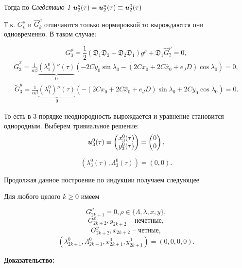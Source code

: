 Тогда по \textit{Следствию 1} $\boldsymbol{u}_2^s(\tau) = \boldsymbol{u}_2^u(\tau) \equiv \boldsymbol{u}_2^0(\tau)$

Т.к. $G_k^\rho$ и $\hat G_k^\rho$ отличаются только нормировкой то вырождаются они одновременно. В таком случае:

$$G_3^\rho = \frac12 (\mathfrak{D}_1 \mathfrak{D}_2 + \mathfrak{D}_2 \mathfrak{D}_1)g^\rho + \mathfrak{D}_1 \hat G_2^\rho = 0,$$
\begin{equation*}
\begin{aligned}
\tilde G_3^x  = \frac{1}{\alpha \beta} \underbrace{(\lambda^0_1)''(\tau)}_0 \left( -2Cy_0 \sin\lambda_0 - (2Cx_0+2C \hat x_0+e_JD) \cos\lambda_0 \right) =0,
\end{aligned}
\end{equation*}
\begin{equation*}
\begin{aligned}
\tilde G_3^y  = \frac{1}{\alpha \beta} \underbrace{(\lambda^0_1)''(\tau)}_0 \left( -(2Cx_0+2C \hat x_0+e_JD) \sin\lambda_0 + 2Cy_0 \cos\lambda_0 \right) = 0.
\end{aligned}
\end{equation*}

То есть в 3 порядке неоднородность вырождается и уравнение становится однородным. Выберем тривиальное решение:
\begin{align*}
    \boldsymbol{u}^0_3(\tau) \equiv \begin{pmatrix} x^0_3(\tau) \\ y^0_3(\tau) \end{pmatrix} = \begin{pmatrix} 0 \\ 0 \end{pmatrix},
\end{align*}

$$(\lambda^0_3(\tau), \Lambda^0_3(\tau)) = (0,0).$$

Продолжая данное построение по индукции получаем следующее

\begin{utv} Для любого целого $k\ge 0$ имеем

$$G_{2k+1}^\rho = 0, \rho \in \{\Lambda,\lambda,x,y\},$$
$$G_{2k+2}^x, y_{2k+2} \text{ -- нечетные},$$
$$G_{2k+2}^y, x_{2k+2} \text{ -- четные},$$
$$({\lambda^0_{2k+1}, \Lambda^0_{2k+1}, x^0_{2k+1}, y^0_{2k+1}}) = (0,0,0,0).$$

\end{utv}
\textbf{Доказательство:}\nopagebreak[4]

